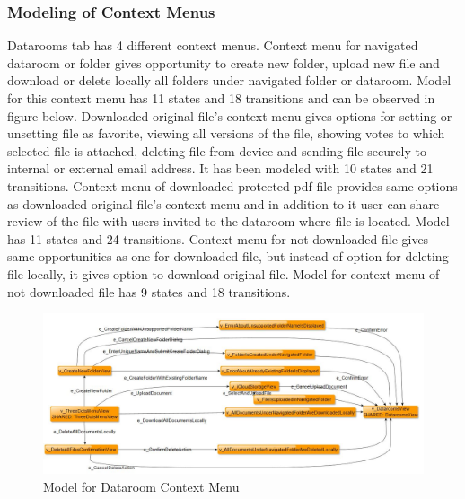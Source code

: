 \subsubsection{Modeling of Context Menus}
\par
Datarooms tab has 4 different context menus. Context menu for navigated dataroom or folder gives opportunity to create new folder, upload new file and download or delete locally all folders under navigated folder or dataroom. Model for this context menu has 11 states and 18 transitions and can be observed in figure below. Downloaded original file's context menu gives options for setting or unsetting file as favorite, viewing all versions of the file, showing votes to which selected file is attached, deleting file from device and sending file securely to internal or external email address. It has been modeled with 10 states and 21 transitions. Context menu of downloaded protected pdf file provides same options as downloaded original file's context menu and in addition to it user can share review of the file with users invited to the dataroom where file is located. Model has 11 states and 24 transitions. Context menu for not downloaded file gives same opportunities as one for downloaded file, but instead of option for deleting file locally, it gives option to download original file. Model for context menu of not downloaded file has 9 states and 18 transitions.

\begin{figure} [htbp!]
	\centering
					\includegraphics[width=1\textwidth]{figures/Context_Menu_model_screenshot}
					\caption{\label{Fig:Context_Menu_model_screenshot} Model for Dataroom Context Menu}
\end{figure}

